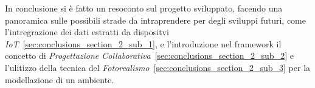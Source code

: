 In conclusione si è fatto un resoconto sul progetto sviluppato, facendo una panoramica sulle possibili strade
da intraprendere per degli sviluppi futuri, come l'intregrazione dei dati estratti da dispositvi
\emph{IoT}~\ref{sec:conclusions_section_2_sub_1},
e l'introduzione nel framework il concetto di \emph{Progettazione Collaborativa}~\ref{sec:conclusions_section_2_sub_2}
e l'ulitizzo della tecnica del \emph{Fotorealismo}~\ref{sec:conclusions_section_2_sub_3} per la modellazione di un ambiente.
